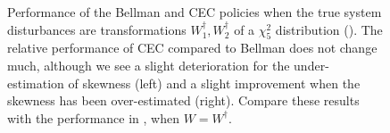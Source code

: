 \documentclass[main.tex]{subfiles}
\begin{document}
\begin{figure}[htbp]
\begin{subfigure}[b]{0.5\textwidth}
  \end{subfigure}
  \caption{Performance of the Bellman  and CEC policies when the true system disturbances
    are transformations $W_1^\dagger,W_2^\dagger$ of
    a $\chi_5^2$ distribution ().
    The relative performance of CEC compared to Bellman does not
    change much,
    although we see a slight deterioration for the under-estimation of
    skewness (left) and a slight improvement when the skewness has
    been over-estimated (right).
    Compare these results with the performance in
    , when $W=W^\dagger$.
  }\label{fig:markdown_bellman_mpc_chi2}
\end{figure}


\biblio
\end{document}

